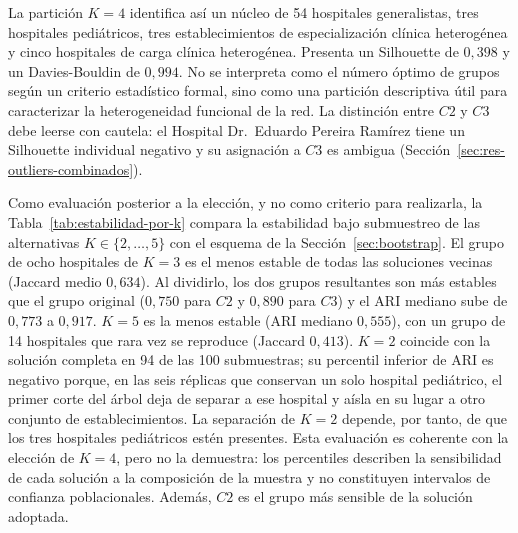 La partición $K=4$ identifica así un núcleo de 54 hospitales generalistas, tres
hospitales pediátricos, tres establecimientos de especialización clínica
heterogénea y cinco hospitales de carga clínica heterogénea. Presenta un
Silhouette de $0{,}398$ y un Davies-Bouldin de $0{,}994$. No se interpreta como
el número óptimo de grupos según un criterio estadístico formal, sino como una
partición descriptiva útil para caracterizar la heterogeneidad funcional de la
red. La distinción entre $C2$ y $C3$ debe leerse con cautela: el Hospital
Dr.\ Eduardo Pereira Ramírez tiene un Silhouette individual negativo y su
asignación a $C3$ es ambigua (Sección~\ref{sec:res-outliers-combinados}).

Como evaluación posterior a la elección, y no como criterio para realizarla, la
Tabla~\ref{tab:estabilidad-por-k} compara la estabilidad bajo submuestreo de
las alternativas $K \in \{2,\ldots,5\}$ con el esquema de la
Sección~\ref{sec:bootstrap}. El grupo de ocho hospitales de $K=3$ es el menos
estable de todas las soluciones vecinas (Jaccard medio $0{,}634$). Al dividirlo,
los dos grupos resultantes son más estables que el grupo original ($0{,}750$
para $C2$ y $0{,}890$ para $C3$) y el ARI mediano sube de $0{,}773$ a $0{,}917$.
$K=5$ es la menos estable (ARI mediano $0{,}555$), con un grupo de 14
hospitales que rara vez se reproduce (Jaccard $0{,}413$). $K=2$ coincide con la
solución completa en 94 de las 100 submuestras; su percentil inferior de ARI es
negativo porque, en las seis réplicas que conservan un solo hospital pediátrico,
el primer corte del árbol deja de separar a ese hospital y aísla en su lugar a
otro conjunto de establecimientos. La separación de $K=2$ depende, por tanto,
de que los tres hospitales pediátricos estén presentes. Esta evaluación es coherente con la elección de
$K=4$, pero no la demuestra: los percentiles describen la sensibilidad de cada
solución a la composición de la muestra y no constituyen intervalos de
confianza poblacionales. Además, $C2$ es el grupo más sensible de la solución
adoptada.

